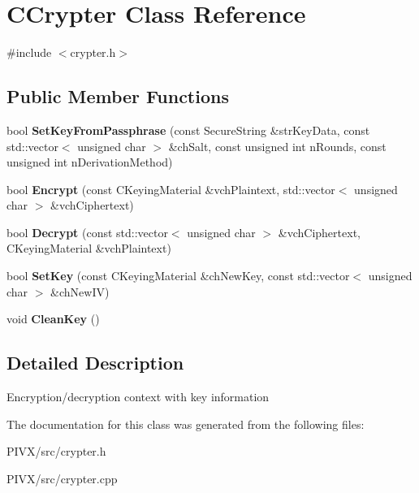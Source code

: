 \hypertarget{class_c_crypter}{}\section{C\+Crypter Class Reference}
\label{class_c_crypter}


{\ttfamily \#include $<$crypter.\+h$>$}

\subsection*{Public Member Functions}
\begin{DoxyCompactItemize}
\item 
\mbox{\label{class_c_crypter_a5368279e4a1549d3c1d15d8aa2179708}} 
bool {\bfseries Set\+Key\+From\+Passphrase} (const Secure\+String \&str\+Key\+Data, const std\+::vector$<$ unsigned char $>$ \&ch\+Salt, const unsigned int n\+Rounds, const unsigned int n\+Derivation\+Method)
\item 
\mbox{\label{class_c_crypter_a124fcd3021569a660ce2daa3391c8ea4}} 
bool {\bfseries Encrypt} (const C\+Keying\+Material \&vch\+Plaintext, std\+::vector$<$ unsigned char $>$ \&vch\+Ciphertext)
\item 
\mbox{\label{class_c_crypter_a4dbabed4975d4435d22c76deac43df7f}} 
bool {\bfseries Decrypt} (const std\+::vector$<$ unsigned char $>$ \&vch\+Ciphertext, C\+Keying\+Material \&vch\+Plaintext)
\item 
\mbox{\label{class_c_crypter_a0d948dd4796e2420e1dd9c1ddbf7974e}} 
bool {\bfseries Set\+Key} (const C\+Keying\+Material \&ch\+New\+Key, const std\+::vector$<$ unsigned char $>$ \&ch\+New\+IV)
\item 
\mbox{\label{class_c_crypter_a6910b4cff4ee40e33fbb3789dc12c139}} 
void {\bfseries Clean\+Key} ()
\end{DoxyCompactItemize}


\subsection{Detailed Description}
Encryption/decryption context with key information 

The documentation for this class was generated from the following files\+:\begin{DoxyCompactItemize}
\item 
P\+I\+V\+X/src/crypter.\+h\item 
P\+I\+V\+X/src/crypter.\+cpp\end{DoxyCompactItemize}
